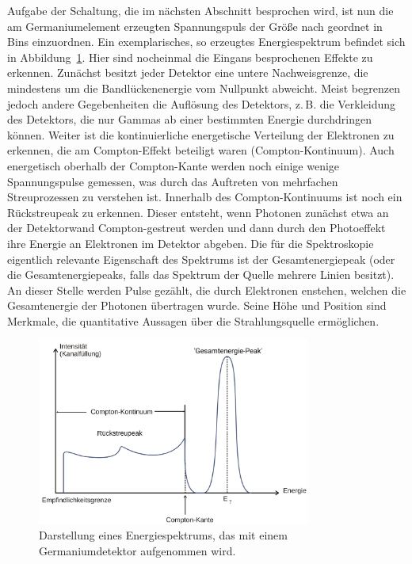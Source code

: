 Aufgabe der Schaltung, die im nächsten Abschnitt besprochen wird, ist nun die am Germaniumelement erzeugten Spannungspuls der 
Größe nach geordnet in Bins einzuordnen. Ein exemplarisches, so erzeugtes Energiespektrum befindet sich in 
Abbildung~\ref{fig: example_spectrum}. Hier sind nocheinmal die Eingans besprochenen Effekte zu erkennen. Zunächst besitzt jeder 
Detektor eine untere Nachweisgrenze, die mindestens um die Bandlückenenergie vom Nullpunkt abweicht. Meist begrenzen jedoch 
andere Gegebenheiten die Auflösung des Detektors, z.\,B. die Verkleidung des Detektors, die nur Gammas ab einer bestimmten Energie 
durchdringen können. Weiter ist die kontinuierliche energetische Verteilung der Elektronen zu erkennen, die am Compton-Effekt 
beteiligt waren (Compton-Kontinuum). Auch energetisch oberhalb der Compton-Kante werden noch einige wenige Spannungspulse gemessen,
was durch das Auftreten von mehrfachen Streuprozessen zu verstehen ist. Innerhalb des Compton-Kontinuums ist noch ein Rückstreupeak 
zu erkennen. Dieser entsteht, wenn Photonen zunächst etwa an der Detektorwand Compton-gestreut werden und dann durch den 
Photoeffekt ihre Energie an Elektronen im Detektor abgeben. 
Die für die Spektroskopie eigentlich relevante Eigenschaft des Spektrums ist der Gesamtenergiepeak (oder die Gesamtenergiepeaks, falls 
das Spektrum der Quelle mehrere Linien besitzt). An dieser Stelle werden Pulse gezählt, die durch Elektronen enstehen, welchen 
die Gesamtenergie der Photonen übertragen wurde.
Seine Höhe und Position sind Merkmale, die quantitative Aussagen über die Strahlungsquelle ermöglichen.   
\begin{figure}
\centering
\includegraphics[width = 0.8\textwidth]{pics/example_spectrum.pdf}
\caption{Darstellung eines Energiespektrums, das mit einem Germaniumdetektor aufgenommen wird.}
\label{fig: example_spectrum}
\end{figure}